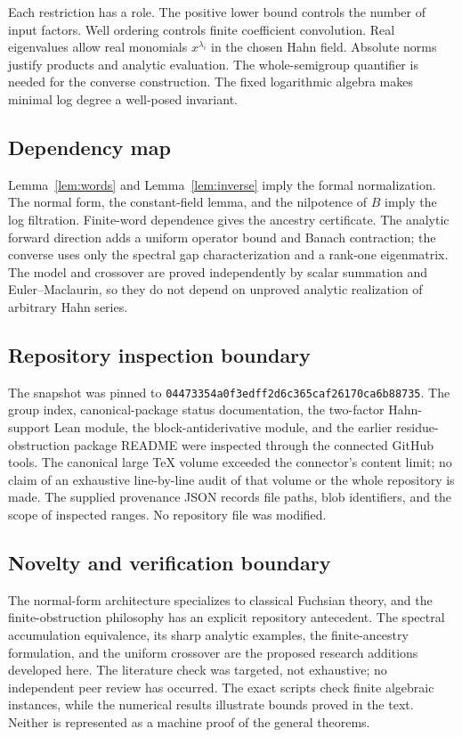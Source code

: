 \documentclass[11pt,a4paper]{article}
\numberwithin{equation}{section}
\theoremstyle{definition}
\theoremstyle{remark}
\newcommand{\snap}{\texttt{04473354a0f3edff2d6c365caf26170ca6b88735}}
\begin{document}
Each restriction has a role. The positive lower bound controls the number
of input factors. Well ordering controls finite coefficient convolution.
Real eigenvalues allow real monomials $x^{\lambda_i}$ in the chosen Hahn
field. Absolute norms justify products and analytic evaluation. The
whole-semigroup quantifier is needed for the converse construction. The
fixed logarithmic algebra makes minimal log degree a well-posed invariant.

\subsection{Dependency map}
Lemma~\ref{lem:words} and Lemma~\ref{lem:inverse} imply the formal
normalization. The normal form, the constant-field lemma, and the
nilpotence of $B$ imply the log filtration. Finite-word dependence gives
the ancestry certificate. The analytic forward direction adds a uniform
operator bound and Banach contraction; the converse uses only the spectral
gap characterization and a rank-one eigenmatrix. The model and crossover
are proved independently by scalar summation and Euler--Maclaurin, so they
do not depend on unproved analytic realization of arbitrary Hahn series.

\subsection{Repository inspection boundary}
The snapshot was pinned to \snap. The group index, canonical-package
status documentation, the two-factor Hahn-support Lean module, the
block-antiderivative module, and the earlier residue-obstruction package
README were inspected through the connected GitHub tools. The canonical
large TeX volume exceeded the connector's content limit; no claim of an
exhaustive line-by-line audit of that volume or the whole repository is made.
The supplied provenance JSON records file paths, blob identifiers, and the
scope of inspected ranges. No repository file was modified.

\subsection{Novelty and verification boundary}
The normal-form architecture specializes to classical Fuchsian theory, and
the finite-obstruction philosophy has an explicit repository antecedent.
The spectral accumulation equivalence, its sharp analytic examples, the
finite-ancestry formulation, and the uniform crossover are the proposed
research additions developed here. The literature check was targeted, not
exhaustive; no independent peer review has occurred. The exact scripts
check finite algebraic instances, while the numerical results illustrate
bounds proved in the text. Neither is represented as a machine proof of
the general theorems.
\end{document}

